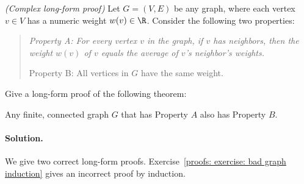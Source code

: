 
\exercise\label{proofs: prob: with lemma}\emph{(Complex long-form proof)}
Let $G=(V,E)$ be any graph, where each vertex $v\in V$ has a numeric weight $w(v)\in\R$.
Consider the following two properties:

\begin{quote}\em
  Property A: For every vertex $v$ in the graph,
  if $v$ has neighbors,
  then the weight $w(v)$ of $v$
  equals the average of $v$'s neighbor's weights.

  Property B: All vertices in $G$ have the same weight.
\end{quote}
Give a long-form proof of the following theorem:

\begin{theorem}
  Any finite, connected graph $G$ that has Property $A$ also has Property $B$.
\end{theorem}


\paragraph{Solution.}  We give two correct long-form proofs.
Exercise~\ref{proofs: exercise: bad graph induction} gives an incorrect proof by induction.

